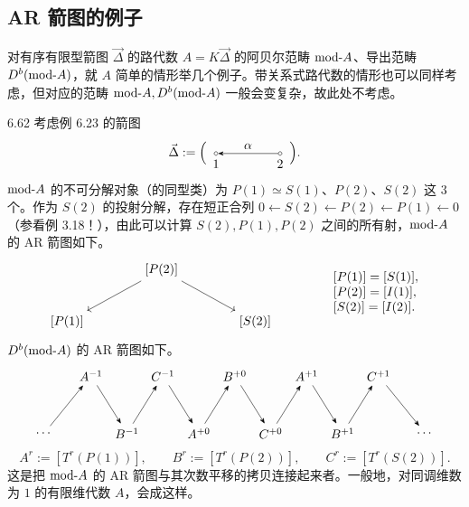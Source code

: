 \subsection{AR 箭图的例子}

对有序有限型箭图 $\vec{\Delta}$ 的路代数 $A=K\vec{\Delta}$ 的阿贝尔范畴 $\mathrm{mod}\text{-}A$、导出范畴 $D^{b}(\mathrm{mod}\text{-}A)$，就 $A$ 简单的情形举几个例子。带关系式路代数的情形也可以同样考虑，但对应的范畴 $\mathrm{mod}\text{-}A,D^{b}(\mathrm{mod}\text{-}A)$ 一般会变复杂，故此处不考虑。

\begin{example}{6.62}
考虑例 6.23 的箭图
\[
\vec{\Delta}:=\Bigl(\,
\begin{tikzpicture}[baseline=-0.5ex]
  \node[draw,circle,inner sep=1pt,label=below:{$1$}] (v1) at (0,0) {};
  \node[draw,circle,inner sep=1pt,label=below:{$2$}] (v2) at (1.8,0) {};
  \draw[-{Stealth}] (v2) -- node[above]{$\alpha$} (v1);
\end{tikzpicture}
\,\Bigr).
\]
$\mathrm{mod}\text{-}A$ 的不可分解对象（的同型类）为 $P(1)\simeq S(1)$、$P(2)$、$S(2)$ 这 $3$ 个。作为 $S(2)$ 的投射分解，存在短正合列 $0\leftarrow S(2)\leftarrow P(2)\leftarrow P(1)\leftarrow 0$（参看例 3.18！），由此可以计算 $S(2),P(1),P(2)$ 之间的所有射，$\mathrm{mod}\text{-}A$ 的 AR 箭图如下。
\[\begin{tikzcd}[row sep=2.4em, column sep=4.0em]
  & {[P(2)]} \arrow[dl] \arrow[dr] & \\
  {[P(1)]} & & {[S(2)]}
\end{tikzcd}
\qquad\qquad
\begin{array}{l}
{[P(1)]=[S(1)]},\\
{[P(2)]=[I(1)]},\\
{[S(2)]=[I(2)]}.
\end{array}
\]
$D^{b}(\mathrm{mod}\text{-}A)$ 的 AR 箭图如下。
\[\begin{tikzpicture}[baseline=-0.5ex,x=1.0cm,y=1.0cm]
  \node (dl) at (-0.3,-0.5) {$\cdots$};
  \node (A) at (1,1.1) {$A^{-1}$};
  \node (B) at (2,-0.5) {$B^{-1}$};
  \node (C) at (3,1.1) {$C^{-1}$};
  \node (A0) at (4,-0.5) {$A^{+0}$};
  \node (B0) at (5,1.1) {$B^{+0}$};
  \node (C0) at (6,-0.5) {$C^{+0}$};
  \node (A1) at (7,1.1) {$A^{+1}$};
  \node (B1) at (8,-0.5) {$B^{+1}$};
  \node (C1) at (9,1.1) {$C^{+1}$};
  \node (dr) at (10.3,-0.5) {$\cdots$};
  \draw[-{Stealth}] (dl) -- (A);
  \draw[-{Stealth}] (A) -- (B);
  \draw[-{Stealth}] (B) -- (C);
  \draw[-{Stealth}] (C) -- (A0);
  \draw[-{Stealth}] (A0) -- (B0);
  \draw[-{Stealth}] (B0) -- (C0);
  \draw[-{Stealth}] (C0) -- (A1);
  \draw[-{Stealth}] (A1) -- (B1);
  \draw[-{Stealth}] (B1) -- (C1);
  \draw[-{Stealth}] (C1) -- (dr);
\end{tikzpicture}
\]
\[
A^{r}:=[T^{r}(P(1))],\qquad B^{r}:=[T^{r}(P(2))],\qquad C^{r}:=[T^{r}(S(2))].
\]
这是把 $\mathrm{mod}\text{-}A$ 的 AR 箭图与其次数平移的拷贝连接起来者。一般地，对同调维数为 $1$ 的有限维代数 $A$，会成这样。
\end{example}


